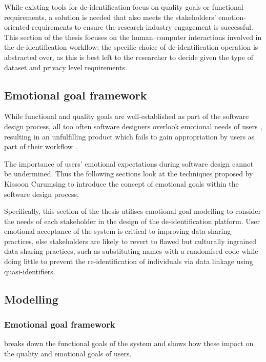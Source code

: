 While existing tools for de-identification focus on quality goals or
functional requirements, a solution is needed that also meets the
stakeholders' emotion-oriented requirements to ensure the
research-industry engagement is successful. This section of the thesis focuses on the
human--computer interactions involved in the de-identification workflow;
the specific choice of de-identification operation is abstracted over, as
this is best left to the researcher to decide given the type of dataset
and privacy level requirements.

\subsection{Emotional goal framework}

While functional and quality goals are well-established as part of the
software design process, all too often software designers overlook
emotional needs of users \cite{norman2004emotional, Ramos2005}, resulting in an unfulfilling
product which fails to gain appropriation by users as part of their
workflow \cite{Mendoza2010, Mendoza2013}.

The importance of users' emotional expectations during software design
cannot be undermined. Thus the following sections look at the techniques proposed by
Kissoon Curumsing \cite{Curumsing2017, Curumsing2018} to introduce the concept of emotional goals within the software design process.

Specifically, this section of the thesis utilises emotional goal modelling to consider the needs of each stakeholder in the design of the de-identification platform. User
emotional acceptance of the system is critical to improving data sharing
practices, else stakeholders are likely to revert to flawed but
culturally ingrained \cite{Ohm2010} data sharing practices, such as
substituting names with a randomised code while doing little to prevent
the re-identification of individuals via data linkage using
quasi-identifiers.

\subsection{Modelling}

\subsubsection{Emotional goal framework}

 breaks down the functional goals of the system and shows how these impact on the quality and emotional goals of users.

